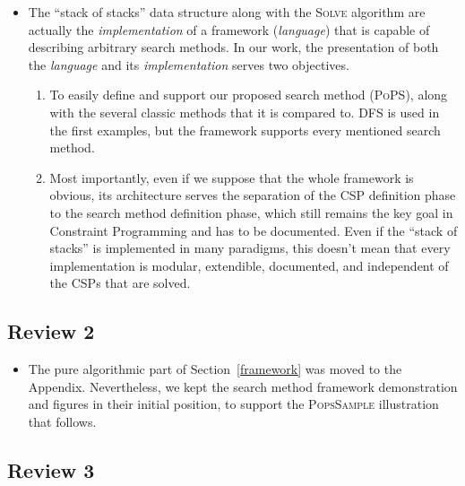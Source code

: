 \documentclass{ws-ijait}
\begin{document}
\begin{itemize}
  \item The ``stack of stacks'' data structure along with
        the \textsc{Solve} algorithm are actually the
        \emph{implementation} of a framework
        (\emph{language}) that is capable of describing
        arbitrary search methods. In our work, the
        presentation of both the \emph{language} and its
        \emph{implementation} serves two objectives.
        \begin{enumerate}
          \item To easily define and support our proposed
                search method (\textsc{PoPS}), along with
                the several classic methods that it is
                compared to. DFS is used in the first
                examples, but the framework supports every
                mentioned search method.
          \item Most importantly, even if we suppose that
                the whole framework is obvious, its
                architecture serves the separation of the
                CSP definition phase to the search method
                definition phase, which still remains the
                key goal in Constraint
                Programming\cite{Freuder2014} and has to be
                documented. Even if the ``stack of stacks''
                is implemented in many paradigms, this
                doesn't mean that every implementation is
                modular, extendible, documented, and
                independent of the CSPs that are solved.
          \end{enumerate}
\end{itemize}

\subsection*{Review 2}

\begin{itemize}
  \item The pure algorithmic part of Section~\ref{framework}
        was moved to the Appendix. Nevertheless, we kept the
        search method framework demonstration and figures in
        their initial position, to support the
        \textsc{PopsSample} illustration that follows.
\end{itemize}

\subsection*{Review 3}
\end{document}
